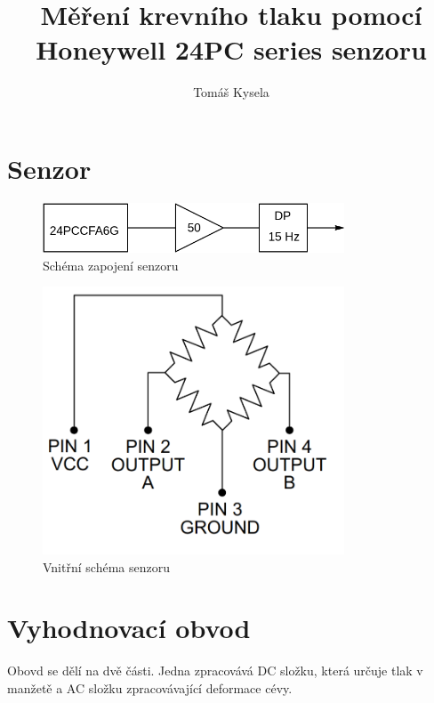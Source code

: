 \documentclass[a4paper,10pt]{article}
\title{Měření krevního tlaku pomocí Honeywell 24PC series senzoru}
\author{Tomáš Kysela}
\begin{document}
\maketitle

\section{Senzor}

\begin{figure}[H]
\centering
\includegraphics[width=0.8\textwidth]{Circuit}
\caption{Schéma zapojení senzoru}
\end{figure}
\begin{figure}[H]
\centering
\includegraphics[width=0.8\textwidth]{bridge}
\caption{Vnitřní schéma senzoru}
\end{figure}

\section{Vyhodnovací obvod}

Obovd se dělí na dvě části. Jedna zpracovává DC složku, která určuje tlak v manžetě a AC složku zpracovávající deformace cévy.
\end{document}
